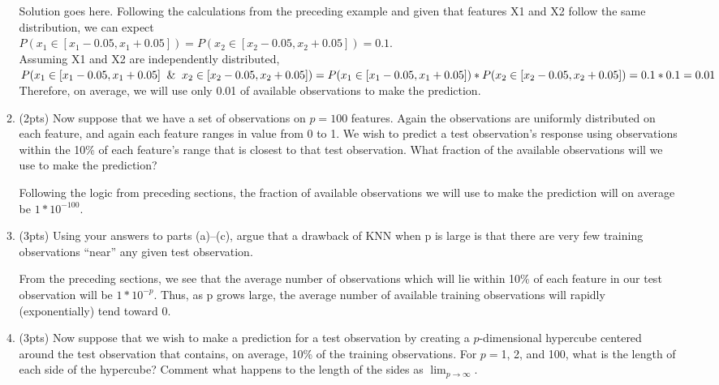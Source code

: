 \documentclass[a4paper]{article}
\theoremstyle{definition}
\newenvironment{soln}{
    \leavevmode\color{blue}\ignorespaces
}{}
\begin{document}
\begin{enumerate}
\begin{enumerate}
	\begin{soln}  
            Solution goes here.
            Following the calculations from the preceding example and given that features X1 and X2 follow the same distribution, we can expect 
            \\$P(x_1 \in [x_1 - 0.05, x_1 + 0.05]) = P(x_2 \in [x_2 - 0.05, x_2 + 0.05]) = 0.1$. \\Assuming X1 and X2 are independently distributed, 
            \\$P(x_1 \in [x_1 - 0.05, x_1 + 0.05] \And x_2 \in [x_2 - 0.05, x_2 + 0.05]) = \\ P(x_1 \in [x_1 - 0.05, x_1 + 0.05]) * P(x_2 \in [x_2 - 0.05, x_2 + 0.05]) = 0.1 * 0.1 = 0.01$
            \\ Therefore, on average, we will use only 0.01 of available observations to make the prediction.
        \end{soln}
	
	\item (2pts) Now suppose that we have a set of observations on $p = 100$ features. Again the observations are uniformly distributed on each feature, and again each feature ranges in value from 0 to 1. We wish to predict a test observation’s response using observations within the 10\% of each feature’s range that is closest to that test observation. What fraction of the available observations will we use to make the prediction?
	
	\begin{soln}   
            Following the logic from preceding sections, the fraction of available observations we will use to make the prediction will on average be $1*10^{-100}$.
        \end{soln}
	
	\item (3pts) Using your answers to parts (a)–(c), argue that a drawback of KNN when p is large is that there are very few training observations “near” any given test observation.
	
	\begin{soln}   
            From the preceding sections, we see that the average number of observations which will lie within 10\% of each feature in our test observation will be $1*10^{-p}$. Thus, as p grows large, the average number of available training observations will rapidly (exponentially) tend toward 0.
        \end{soln}
	
	\item (3pts) Now suppose that we wish to make a prediction for a test observation by creating a $p$-dimensional hypercube centered around the test observation that contains, on average, 10\% of the training observations. For $p =$1, 2, and 100, what is the length of each side of the hypercube? Comment what happens to the length of the sides as $\lim_{{p \to \infty}}$.
	

\end{enumerate}
\end{enumerate}
\end{document}
